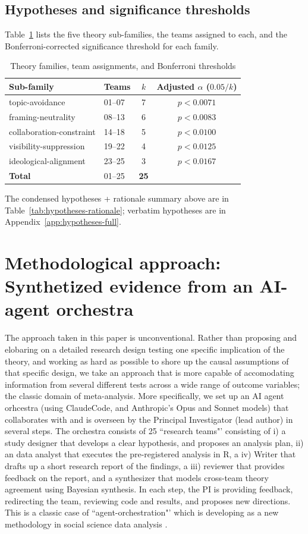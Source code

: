 \documentclass[12pt,a4paper]{article}
\begin{document}
\subsection{Hypotheses and significance thresholds}
Table~\ref{tab:families} lists the five theory sub-families, the teams
assigned to each, and the Bonferroni-corrected significance threshold for each family.

\begin{table}[ht]
\centering
\caption{Theory families, team assignments, and Bonferroni thresholds}
\label{tab:families}
\begin{tabular}{llcc}
\toprule
Sub-family & Teams & $k$ & Adjusted $\alpha$ ($0.05/k$) \\
\midrule
topic-avoidance          & 01--07 & 7 & $p < 0.0071$ \\
framing-neutrality       & 08--13 & 6 & $p < 0.0083$ \\
collaboration-constraint & 14--18 & 5 & $p < 0.0100$ \\
visibility-suppression   & 19--22 & 4 & $p < 0.0125$ \\
ideological-alignment    & 23--25 & 3 & $p < 0.0167$ \\
\midrule
\textbf{Total}           & 01--25 & \textbf{25} & \\
\bottomrule
\end{tabular}
\end{table}

The condensed hypotheses + rationale summary above are in Table~\ref{tab:hypotheses-rationale}; verbatim hypotheses are in Appendix~\ref{app:hypotheses-full}.

\section{Methodological approach: Synthetized evidence from an AI-agent orchestra}
The approach taken in this paper is unconventional. Rather than proposing and elobaring on a detailed research design testing one specific implication of the theory, and working as hard as possible to shore up the causal assumptions of that specific design, we take an approach that is more capable of accomodating information from several different tests across a wide range of outcome variables; the classic domain of meta-analysis. More specifically, we set up an AI agent orhcestra (using ClaudeCode, and Anthropic's Opus and Sonnet models) that collaborates with and is overseen by the Principal Investigator (lead author) in several steps. The orchestra consists of 25 ``research teams"' consisting of i) a study designer that develops a clear hypothesis, and proposes an analysis plan, ii) an data analyst that executes the pre-registered analysis in R, a iv) Writer that drafts up a short research report of the findings, a iii) reviewer that provides feedback on the report, and a synthesizer that models cross-team theory agreement using Bayesian synthesis. In each step, the PI is providing feedback, redirecting the team, reviewing code and results, and proposes new directions. This is a classic case of ``agent-orchestration"' which is developing as a new methodology in social science data analysis \citep{zhu2026hler,gupta2026accelerating}. 
\end{document}

